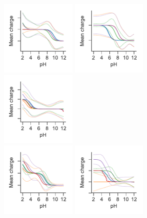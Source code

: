 \documentclass[9pt,lineno,final]{elife}
\begin{document}
 \begin{figure}[H]	
	\centering
	\includegraphics[width=0.33\textwidth]{Reports/overview-virtual-titration-SM19.pdf}
	\includegraphics[width=0.33\textwidth]{Reports/overview-virtual-titration-SM20.pdf}
	\includegraphics[width=0.33\textwidth]{Reports/overview-virtual-titration-SM21.pdf}	 \\
	\includegraphics[width=0.33\textwidth]{Reports/overview-virtual-titration-SM22.pdf}
	\includegraphics[width=0.33\textwidth]{Reports/overview-virtual-titration-SM23.pdf}

\end{figure}
\end{document}
